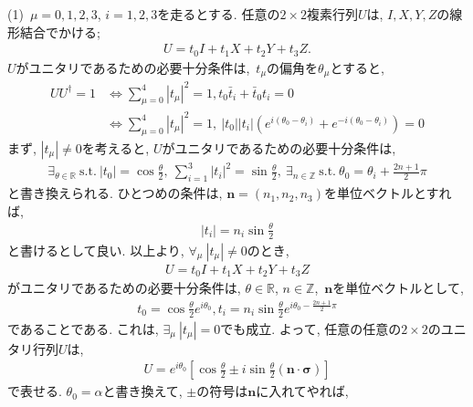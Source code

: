 \begin{ex}
    \label{ex4.8}
    (1)\
    $\mu = 0, 1, 2, 3$, $i = 1,2 ,3$を走るとする.
    任意の$2\times 2$複素行列$U$は, ${I,X,Y,Z}$の線形結合でかける;
    \begin{align*}
        U = t_0 I + t_1 X + t_2 Y + t_3 Z.
    \end{align*}
    $U$がユニタリであるための必要十分条件は,\ $t_\mu$の偏角を$\theta_\mu$とすると,
    \begin{align*}
        U U^\dagger = 1
         & \Longleftrightarrow \sum_{\mu=0}^4|t_\mu|^2 = 1 , t_0\bar{t}_i + \bar{t}_0 t_i =0                                                         \\
         & \Longleftrightarrow \sum_{\mu=0}^4|t_\mu|^2 = 1 ,\ |t_0| |t_i| \left( e^{i(\theta_0 - \theta_i)} + e^{-i(\theta_0 - \theta_i)}\right) = 0
    \end{align*}
    まず, $|t_\mu| \neq 0$を考えると, $U$がユニタリであるための必要十分条件は,
    \begin{align*}
        \exists_{\theta \in \mathbb{R} }\  \mathrm{s.t.}\  |t_0| = \cos\frac{\theta}{2} ,\  \sum_{i=1}^3|t_i|^2 = \sin\frac{\theta}{2}, \
        \exists_{n \in \mathbb{Z} }\  \mathrm{s.t.}\ \theta_0 = \theta_i + \frac{2n+1}{2} \pi
    \end{align*}
    と書き換えられる. ひとつめの条件は, $\bm{n} = (n_1,n_2,n_3)$を単位ベクトルとすれば,
    \begin{align*}
        |t_i| = n_i \sin\frac{\theta}{2}
    \end{align*}
    と書けるとして良い. 以上より, $\forall_\mu \ |t_\mu| \neq 0$のとき,
    \begin{align*}
        U = t_0 I + t_1 X + t_2 Y + t_3 Z
    \end{align*}
    がユニタリであるための必要十分条件は,
    $\theta \in \mathbb{R}$, $n\in \mathbb{Z}$,\ $\bm{n}$を単位ベクトルとして,
    \begin{align*}
        t_0 = \cos\frac{\theta}{2}e^{i \theta_0}, t_i =  n_i\sin\frac{\theta}{2} e^{i \theta_0 - \frac{2n +1}{2} \pi}
    \end{align*}
    であることである. これは, $\exists_\mu \ |t_\mu| = 0$でも成立. よって, 任意の任意の$2\times 2$のユニタリ行列$U$は,
    \begin{align*}
        U = e^{i \theta_0}
        \left[ \cos\frac{\theta}{2} \pm i \sin\frac{\theta}{2} \left(\bm{n} \cdot \bm{\sigma}\right)
            \right]
    \end{align*}
    で表せる. $\theta_0 = \alpha$と書き換えて, $\pm$の符号は$\bm{n}$に入れてやれば,

\end{ex}
